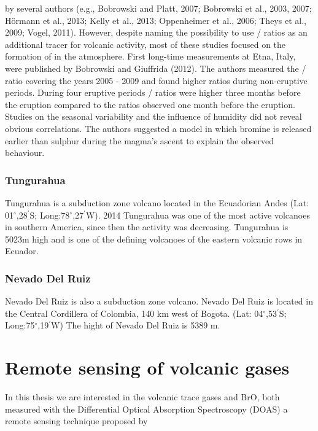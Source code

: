 \documentclass  [
  paper    = a4,
  BCOR     = 10mm,
  twoside,
  fontsize = 12pt,
  fleqn,
  toc      = bibnumbered,
  toc      = listofnumbered,
  numbers  = noendperiod,
  headings = normal,
  listof   = leveldown,
  version  = 3.03
]                                       {scrreprt}
\begin{document}
{	by several authors (e.g., Bobrowski and Platt, 2007; Bobrowski et al.,
	2003, 2007; Hörmann et al., 2013; Kelly et al., 2013; Oppenheimer et al., 2006;
	Theys et al., 2009; Vogel, 2011). However, despite naming the possibility to
	use / ratios as an additional tracer for volcanic activity, most of these
	studies focused on the formation of  in the atmosphere. First long-time
	measurements at Etna, Italy, were published by Bobrowski and Giuffrida (2012).
	The authors measured the / ratio covering the years 2005 - 2009 and
	found higher ratios during non-eruptive periods. During four eruptive periods
	/ ratios were higher three months before the eruption compared to the
	ratios observed one month before the eruption. Studies on the seasonal variability
	and the influence of humidity did not reveal obvious correlations. The authors
	suggested a model in which bromine is released earlier than sulphur during the
	magma’s ascent to explain the observed behaviour.}
	\subsection*{Tungurahua}
	Tungurahua is a subduction zone volcano located in the Ecuadorian Andes (Lat: 01$^{\circ}$,28$^{'}$S; Long:78$^{\circ}$,27$^{'}$W). 2014 Tungurahua was one of the most active volcanoes in southern America, since then the activity was decreasing. Tungurahua is 5023m high and is one of the defining volcanoes of the eastern volcanic rows in Ecuador. \cite{hall1999tungurahua}
	

	
	\subsection*{Nevado Del Ruiz}
	Nevado Del Ruiz is also a subduction zone volcano. 	Nevado Del Ruiz  is located in the Central Cordillera of Colombia, 140 km west of Bogota.
	(Lat: 04$^{\circ}$,53$^{'}$S; Long:75$^{\circ}$,19$^{'}$W) 
	The hight of Nevado Del Ruiz is 5389 m.
	 
	\chapter{Remote sensing of volcanic gases}
	In this thesis we are interested in the volcanic trace gases  and BrO, both measured with the Differential Optical Absorption Spectroscopy (DOAS) a remote sensing technique proposed by \cite{platt2008differential}\\
	
\end{document}
